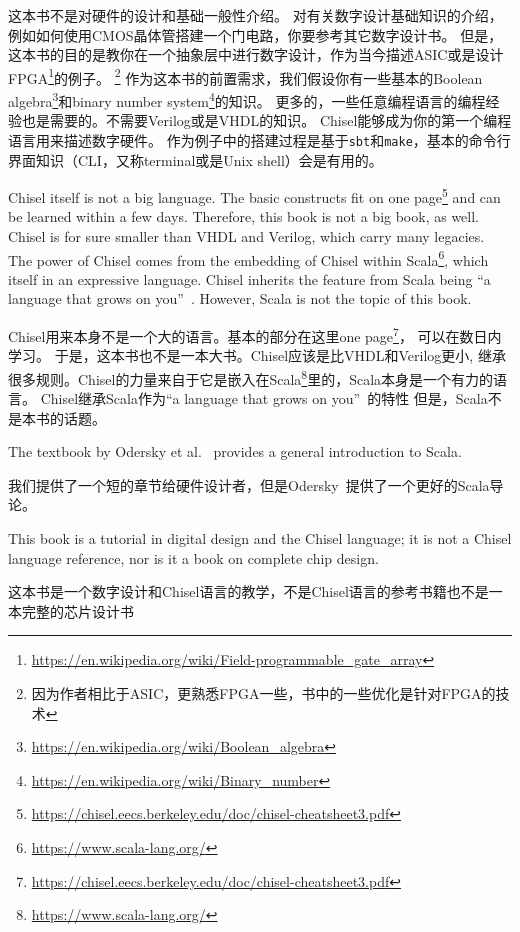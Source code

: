 \documentclass[%
    10pt,
    headinclude, footexclude,
    openright, %
    notitlepage,
    cleardoubleempty,
    headsepline,
    pointlessnumbers,
    bibtotoc, idxtotoc,
    ]{scrbook}
\newcommand{\code}[1]{{\small{\texttt{#1}}}}
\newcommand{\myref}[2]{\href{#1}{#2}}
\renewcommand{\myref}[2]{{#2}{\footnote{\url{#1}}}}
\begin{document}
这本书不是对硬件的设计和基础一般性介绍。
对有关数字设计基础知识的介绍，例如如何使用CMOS晶体管搭建一个门电路，你要参考其它数字设计书。
但是，这本书的目的是教你在一个抽象层中进行数字设计，作为当今描述ASIC或是设计
\myref{https://en.wikipedia.org/wiki/Field-programmable_gate_array}{FPGA}的例子。
\footnote{因为作者相比于ASIC，更熟悉FPGA一些，书中的一些优化是针对FPGA的技术}
作为这本书的前置需求，我们假设你有一些基本的\myref{https://en.wikipedia.org/wiki/Boolean_algebra}{Boolean algebra}和\myref{https://en.wikipedia.org/wiki/Binary_number}{binary number system}的知识。
更多的，一些任意编程语言的编程经验也是需要的。不需要Verilog或是VHDL的知识。
Chisel能够成为你的第一个编程语言用来描述数字硬件。
作为例子中的搭建过程是基于\code{sbt}和\code{make}，基本的命令行界面知识（CLI，又称terminal或是Unix shell）会是有用的。

Chisel itself is not a big language. The basic constructs fit on
\myref{https://chisel.eecs.berkeley.edu/doc/chisel-cheatsheet3.pdf}{one page}
and can be learned within a few days.
Therefore, this book is not a big book, as well.
Chisel is for sure smaller than VHDL and Verilog, which carry many legacies.
The power of Chisel comes from the embedding of Chisel within
\myref{https://www.scala-lang.org/}{Scala}, which itself in an expressive language.
Chisel inherits the feature from Scala being ``a language that grows on you''~\cite{Scala}.
However, Scala is not the topic of this book.

Chisel用来本身不是一个大的语言。基本的部分在这里\myref{https://chisel.eecs.berkeley.edu/doc/chisel-cheatsheet3.pdf}{one page}， 可以在数日内学习。
于是，这本书也不是一本大书。Chisel应该是比VHDL和Verilog更小, 
继承很多规则。Chisel的力量来自于它是嵌入在\myref{https://www.scala-lang.org/}{Scala}里的，Scala本身是一个有力的语言。
Chisel继承Scala作为``a language that grows on you''~\cite{Scala}的特性
但是，Scala不是本书的话题。

The textbook by Odersky et al.~\cite{Scala} provides a general introduction
to Scala.

我们提供了一个短的章节给硬件设计者，但是Odersky~\cite{Scala}提供了一个更好的Scala导论。

This book is a tutorial in digital design and the Chisel language; it is not
a Chisel language reference, nor is it a book on complete chip design.

这本书是一个数字设计和Chisel语言的教学，不是Chisel语言的参考书籍也不是一本完整的芯片设计书
\end{document}
